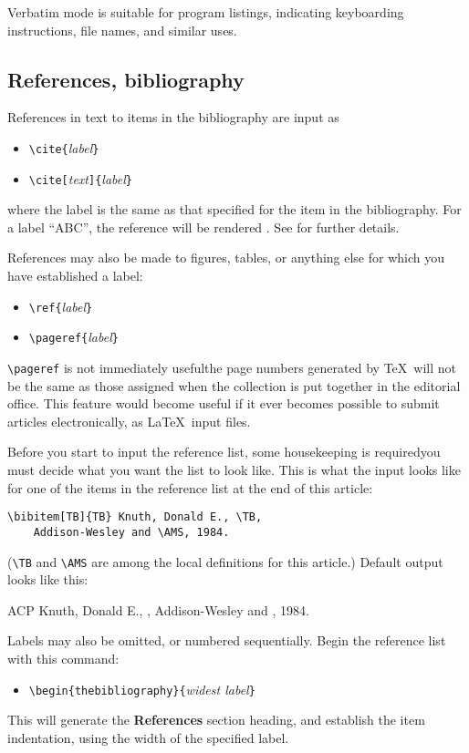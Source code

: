Verbatim mode is suitable for program listings, indicating keyboarding
instructions, file names, and similar uses.

\subsection{References, bibliography}

References in text to items in the bibliography are input as
\begin{itemize}
\item[] \verb"\cite{"{\it label\/}\verb"}"
\item[] \verb"\cite["{\it text\/}\verb"]{"{\it label\/}\verb"}"
\end{itemize}
where the label is the same as that specified for the item in the bibliography.
For a label ``ABC'', the reference will be rendered .
See \cite[pp.~73, 189]{LT} for further details.

References may also be made to figures, tables, or anything else for which
you have established a label:
\begin{itemize}
\item[] \verb"\ref{"{\it label\/}\verb"}"
\item[] \verb"\pageref{"{\it label\/}\verb"}"
\end{itemize}
\verb"\pageref" is not immediately useful\Dash the page numbers
generated by \TeX\ will not be the same as those assigned when the
collection is put together in the editorial office.  This feature would
become useful if it ever becomes possible to submit articles electronically,
as \LaTeX\ input files.

Before you start to input the reference list, some housekeeping is
required\Dash you must decide what you want the list to look like.
This is what the input looks like for one of the items in the reference
list at the end of this article:
\begin{verbatim}
\bibitem[TB]{TB} Knuth, Donald E., \TB,
    Addison-Wesley and \AMS, 1984.
\end{verbatim}
(\verb"\TB" and \verb"\AMS" are among the local definitions for this article.)
Default output looks like this:
\smallskip
{\begin{pseudobibliography}{ACP}
 Knuth, Donald E., \TB, Addison-Wesley and \AMS, 1984.\endgraf
\end{pseudobibliography}
}
\smallskip

Labels may also be omitted, or numbered sequentially.  Begin the
reference list with this command:
\begin{itemize}
\item[] \verb"\begin{thebibliography}{"{\it widest label\/}\verb"}"
\end{itemize}
This will generate the {\bf References} section heading, and establish
the item indentation, using the width of the specified label.

